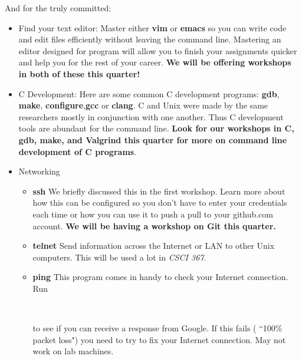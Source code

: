 \documentclass[oneside]{book}
\newcommand{\commandline}[1]{\begin{center} \colorbox{Dark}{\textcolor{white}{#1}} \end{center}}
\begin{document}
\newpage

And for the truly committed: 
\begin{itemize}
        \item{Find your text editor:} Master either \textbf{vim} or \textbf{emacs} so you can write code and edit files efficiently without leaving the command line. Mastering an editor designed for program will allow you to finish your assignments quicker and help you for the rest of your career. \textbf{We will be offering workshops in both of these this quarter!}
        \item{C Development:} Here are some common C development programs: \textbf{gdb}, \textbf{make},
            \textbf{configure},\textbf{gcc} or \textbf{clang}. C and Unix were made by the same researchers mostly in conjunction with one another. Thus C development tools are abundant for the command line. \textbf{Look for our workshops in C, gdb, make, and Valgrind this quarter for more on command line development of C programs}.
        \item{Networking}
            \begin{itemize}
                \item{\textbf{ssh}} We briefly discussed this in the first workshop. Learn more about how this can be configured so you don't have to enter your credentials each time or how you can use it to push a pull to your github.com account. \textbf{We will be having a workshop on Git this quarter.}
                \item{\textbf{telnet}} Send information across the Internet or LAN to other Unix computers. This will be used a lot in     \textit{CSCI 367}.
                \item{\textbf{ping}} This program comes in handy to check your Internet connection. Run \commandline{ping -c 3 www.google.com} to see if you can receive a response from Google. If this fails ( ``100\% packet loss") you need to try to fix your Internet connection. May not work on lab machines.
            \end{itemize}


\end{itemize}
\end{document}

